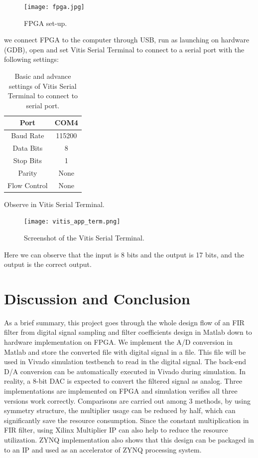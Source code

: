 \documentclass[a4paper]{article}
\begin{document}
\begin{figure}[H]
    \centering
    \texttt{[image: fpga.jpg]}
    \caption{FPGA set-up.}
\end{figure}
we connect FPGA to the computer through USB, run as launching on hardware (GDB), open and set Vitis Serial Terminal to connect to a serial port with the following settings:
\begin{table}[H]
    \centering
    \begin{tabular}{|c|c|}
        \hline
        Port&COM4\\
        \hline
        Baud Rate&115200\\
        \hline
        Data Bits&8\\
        \hline
        Stop Bits&1\\
        \hline
        Parity&None\\
        \hline
        Flow Control&None\\
        \hline
    \end{tabular}
    \caption{Basic and advance settings of Vitis Serial Terminal to connect to serial port.}
\end{table}
Observe in Vitis Serial Terminal.
\begin{figure}[H]
    \centering
    \texttt{[image: vitis\_app\_term.png]}
    \caption{Screenshot of the Vitis Serial Terminal.}
\end{figure}
Here we can observe that the input is 8 bits and the output is 17 bits, and the output is the correct output.
\section{Discussion and Conclusion}

As a brief summary, this project goes through the whole design flow of an FIR filter from digital signal sampling and filter coefficients design in Matlab down to hardware implementation on FPGA. We implement the A/D conversion in Matlab and store the converted file with digital signal in a file. This file will be used in Vivado simulation testbench to read in the digital signal. The back-end D/A conversion can be automatically executed in Vivado during simulation. In reality, a 8-bit DAC is expected to convert the filtered signal as analog. Three implementations are implemented on FPGA and simulation verifies all three versions work correctly. Comparisons are carried out among 3 methods, by using symmetry structure, the multiplier usage can be reduced by half, which can significantly save the resource consumption. Since the constant multiplication in FIR filter, using Xilinx Multiplier IP can also help to reduce the resource utilization. ZYNQ implementation also shows that this design can be packaged in to an IP and used as an accelerator of ZYNQ processing system. 
\end{document}
